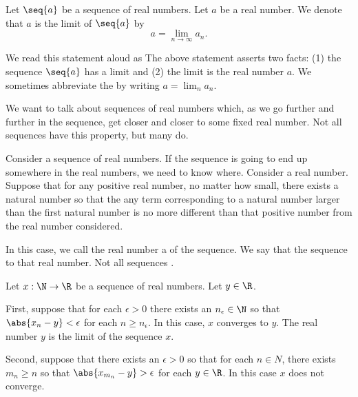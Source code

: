 
Let $\seq{a}$
be a sequence of
real numbers.
Let $a$ be a real number.
We denote that $a$ is the limit of
$\seq{a}$ by
\[
  a = \lim_{n \to \infty} a_n.
\]

We read this statement aloud as
The above statement asserts two
facts: (1) the sequence
$\seq{a}$ has a limit and (2)
the limit is the real number $a$.
We sometimes abbreviate
the by writing
$a = \lim_{n} a_n$.


We want to talk about
sequences of real numbers
which, as we go further
and further in the sequence,
get closer and closer to
some fixed real number.
Not all sequences have this
property, but many do.


Consider a sequence of real
numbers.
If the sequence is going to
end up somewhere in the real
numbers, we need to know where.
Consider a real number.
Suppose that for any positive
real number, no matter how small,
there exists a natural number so that
the any term corresponding to a natural
number larger than the first natural number
is no more different than that positive number
from the real number considered.

In this case, we call the real number
a  of the sequence. We say
that the sequence  to
that real number.
Not all sequences .


Let $x: \N \to \R$ be a sequence of
real numbers.
Let $y \in \R$.

First,
suppose that
for each $\epsilon > 0$
there exists an $n_\epsilon \in \N$ so that
$\abs{x_n - y} < \epsilon$
for each $n \geq n_\epsilon$.
In this case, $x$ converges to $y$.
The real number
$y$ is the limit
of
the sequence $x$.

Second, suppose that there exists
an $\epsilon > 0$ so that
for each $n \in N$, there
exists $m_n \geq n$ so that
$\abs{x_{m_n} - y} > \epsilon$
for each $y \in \R$.
In this case $x$ does not converge.
